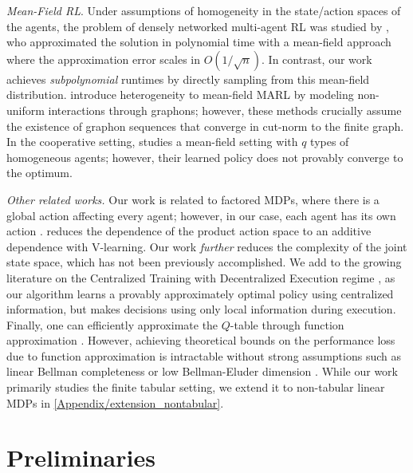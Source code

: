 \documentclass{article}
\theoremstyle{plain}
\theoremstyle{definition}
\begin{document}
\emph{Mean-Field RL}. Under assumptions of homogeneity in the state/action spaces of the agents, the problem of densely networked multi-agent RL was studied by \citet{pmlr-v80-yang18d,doi:10.1137/20M1360700}, who approximated the solution in polynomial time with a mean-field approach where the approximation error scales in $O(1/\sqrt{n})$. 
In contrast, our work achieves \emph{subpolynomial} runtimes by directly sampling from this mean-field distribution.
\citet{cui2022learning} introduce heterogeneity to mean-field MARL by modeling non-uniform interactions through graphons; however, these methods crucially assume the existence of graphon sequences that converge in cut-norm to the finite graph. In the cooperative setting, \citet{subramanian2022decentralized,cui2023multiagent} studies a mean-field setting with $q$ types of homogeneous agents; however, their learned policy does not provably converge to the optimum.

\emph{Other related works.} Our work is related to factored MDPs, where there is a global action affecting every agent; however, in
our case, each agent has its own action \citep{pmlr-v202-min23a,10.5555/645529.658113}.
 \citet{pmlr-v125-jin20a} reduces the dependence of the product action space to an
additive dependence with V-learning. Our work \emph{further} reduces the complexity of the joint state space, which has not been previously accomplished. We add to the growing literature on the Centralized Training with Decentralized Execution regime \citep{zhou2023centralizedtrainingdecentralizedexecution}, as our algorithm learns a provably approximately optimal policy using centralized information, but makes decisions using only local information during execution. Finally, one can efficiently approximate the $Q$-table through function approximation \citep{jin2021bellmaneluderdimensionnew}. However, achieving theoretical bounds on the performance loss due to function approximation is intractable without strong assumptions such as linear Bellman completeness or low Bellman-Eluder dimension \citep{golowich2024roleinherentbellmanerror}. While our work primarily studies the finite tabular setting, we extend it to non-tabular linear MDPs in \cref{Appendix/extension_nontabular}. 



\section{Preliminaries}
\label{section: preliminaries}
\end{document}
